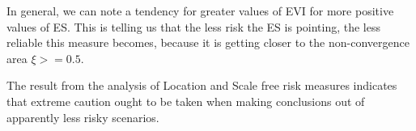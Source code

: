 In general, we can note a tendency for greater values of EVI for more positive values of ES. This is telling us that the less risk the ES is pointing, the less reliable this measure becomes, because it is getting closer to the non-convergence area $\xi >= 0.5$.

The result from the analysis of Location and Scale free risk measures indicates that extreme caution ought to be taken when making conclusions out of apparently less risky scenarios.









